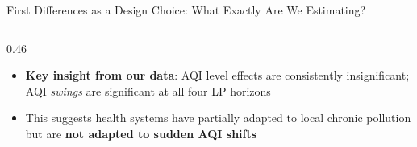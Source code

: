 \documentclass[aspectratio=169,11pt]{beamer}
\newcommand{\emphcolor}[1]{{\color{WarmOrange}\textbf{#1}}}
\begin{document}
\begin{frame}[shrink=18]{First Differences as a Design Choice: What Exactly Are We Estimating?}
\begin{columns}[T]
\begin{column}{0.46\textwidth}
\begin{block}{}
      \end{block}
      \vspace{0.3em}
      \begin{itemize}\itemsep0.14em
        \item \emphcolor{Key insight from our data}: AQI level effects are consistently insignificant; AQI \emph{swings} are significant at all four LP horizons
        \item This suggests health systems have partially adapted to local chronic pollution but are \emphcolor{not adapted to sudden AQI shifts}
      \end{itemize}
    \end{column}
  \end{columns}
\end{frame}

\end{document}
